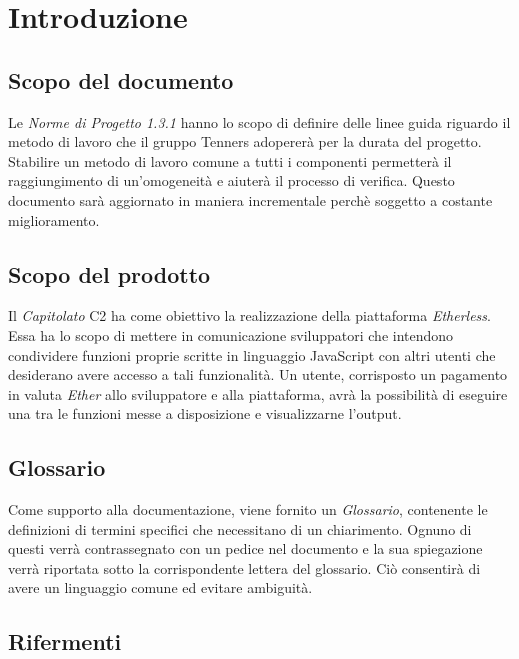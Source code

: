 \section{Introduzione}

\subsection{Scopo del documento}
Le \textit{Norme di Progetto 1.3.1\doc} hanno lo scopo di definire delle linee guida riguardo il metodo di lavoro che il gruppo Tenners adopererà per la durata del progetto. Stabilire un metodo di lavoro comune a tutti i componenti permetterà il raggiungimento di un'omogeneità e aiuterà il processo di verifica. Questo documento sar\`a aggiornato in maniera incrementale perchè soggetto a costante miglioramento.

\subsection{Scopo del prodotto}
Il \textit{Capitolato\glo} C2 ha come obiettivo la realizzazione della piattaforma \textit{Etherless}. Essa ha lo scopo di mettere in comunicazione sviluppatori che intendono condividere funzioni proprie scritte in linguaggio JavaScript con altri utenti che desiderano avere accesso a tali funzionalità. Un utente, corrisposto un pagamento in valuta \textit{Ether\glos} allo sviluppatore e alla piattaforma, avrà la possibilità di eseguire una tra le funzioni messe a disposizione e visualizzarne l'output. 


\subsection{Glossario}
Come supporto alla documentazione, viene fornito un \textit{Glossario}\docs,
contenente le definizioni di termini specifici che necessitano di un chiarimento.
Ognuno di questi verr\`a contrassegnato con un pedice \glo nel documento e la sua
spiegazione verr\`a riportata sotto la corrispondente lettera del glossario. Ci\`o
consentir\`a di avere un linguaggio comune ed evitare ambiguit\`a.

\subsection{Rifermenti}
